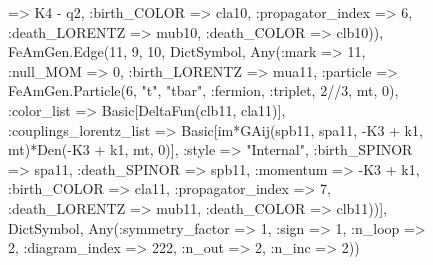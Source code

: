 \documentclass{revtex4}
\begin{document}
\begin{figure}[!htb]
\begin{center}
{=> K4 - q2, :birth_COLOR => cla10, :propagator_index => 6, :death_LORENTZ => mub10, :death_COLOR => clb10)), FeAmGen.Edge(11, 9, 10, Dict{Symbol, Any}(:mark => 11, :null_MOM => 0, :birth_LORENTZ => mua11, :particle => FeAmGen.Particle(6, "t", "tbar", :fermion, :triplet, 2//3, mt, 0), :color_list => Basic[DeltaFun(clb11, cla11)], :couplings_lorentz_list => Basic[im*GAij(spb11, spa11, -K3 + k1, mt)*Den(-K3 + k1, mt, 0)], :style => "Internal", :birth_SPINOR => spa11, :death_SPINOR => spb11, :momentum => -K3 + k1, :birth_COLOR => cla11, :propagator_index => 7, :death_LORENTZ => mub11, :death_COLOR => clb11))], Dict{Symbol, Any}(:symmetry_factor => 1, :sign => 1, :n_loop => 2, :diagram_index => 222, :n_out => 2, :n_inc => 2)) 
}
\end{center}
\end{figure}
\end{document}
